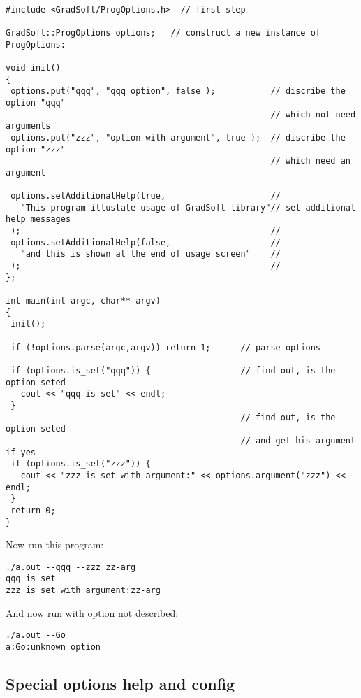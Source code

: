 \documentclass[10pt]{article}
\begin{document}
\begin{verbatim}

#include <GradSoft/ProgOptions.h>  // first step

GradSoft::ProgOptions options;   // construct a new instance of ProgOptions: 

void init()
{
 options.put("qqq", "qqq option", false );           // discribe the option "qqq"
                                                     // which not need arguments
 options.put("zzz", "option with argument", true );  // discribe the option "zzz"
                                                     // which need an argument

 options.setAdditionalHelp(true,                     // 
   "This program illustate usage of GradSoft library"// set additional help messages
 );                                                  //  
 options.setAdditionalHelp(false,                    // 
   "and this is shown at the end of usage screen"    // 
 );                                                  //
};

int main(int argc, char** argv)                      
{
 init();                                       

 if (!options.parse(argc,argv)) return 1;      // parse options

 if (options.is_set("qqq")) {                  // find out, is the option seted
   cout << "qqq is set" << endl;
 }
                                               // find out, is the option seted
                                               // and get his argument if yes
 if (options.is_set("zzz")) {
   cout << "zzz is set with argument:" << options.argument("zzz") << endl;
 }
 return 0;
}

\end{verbatim}

Now run this program:

\begin{verbatim}
./a.out --qqq --zzz zz-arg
qqq is set
zzz is set with argument:zz-arg
\end{verbatim}

And now run with option not described:

\begin{verbatim}
./a.out --Go
a:Go:unknown option
\end{verbatim}


\subsection{ Special options help and config}
\end{document}
